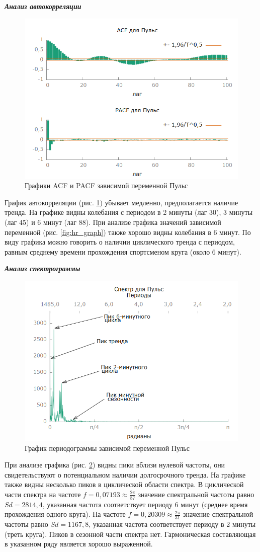 \documentclass[a4paper,12pt]{article}
\begin{document}
\textbf{\textit{Анализ автокорреляции}}

\begin{figure}[H]
	\centering
	\includegraphics[width=0.5\linewidth]{../[graphics]/hr_acf_100}
	\caption{Графики ACF и PACF зависимой переменной Пульс}
	\label{fig:hr_acf_100}
\end{figure}

График автокорреляции (рис. \ref{fig:hr_acf_100}) убывает медленно, предполагается наличие тренда. На графике видны колебания с периодом в 2 минуты (лаг 30), 3 минуты (лаг 45) и 6 минут (лаг 88). При анализе графика значений зависимой переменной (рис. \ref{fig:hr_graph}) также хорошо видны колебания в 6 минут. По виду графика можно говорить о наличии циклического тренда с периодом, равным среднему времени прохождения спортсменом круга (около 6 минут).

\textbf{\textit{Анализ спектрограммы}}

\begin{figure}[H]
	\centering
	\includegraphics[width=0.5\linewidth]{../[graphics]/hr_spectr}
	\caption{График периодограммы зависимой переменной Пульс}
	\label{fig:hr_spectr}
\end{figure}

При анализе графика (рис. \ref{fig:hr_spectr}) видны пики вблизи нулевой частоты, они свидетельствуют о потенциальном наличии долгосрочного тренда. На графике также видны несколько пиков в циклической области спектра. 
В циклической части спектра на частоте $f = 0,07193 \approx \frac{2 \pi}{87}$ значение спектральной частоты равно $Sd = 2814,4$, указанная частота соответствует периоду 6 минут (среднее время прохождения одного круга).
На частоте $f = 0,20309 \approx \frac{2 \pi}{31}$ значение спектральной частоты равно $Sd = 1167,8$, указанная частота соответствует периоду в 2 минуты (треть круга).
Пиков в сезонной части спектра нет. 
Гармоническая составляющая в указанном ряду является хорошо выраженной.
\end{document}
